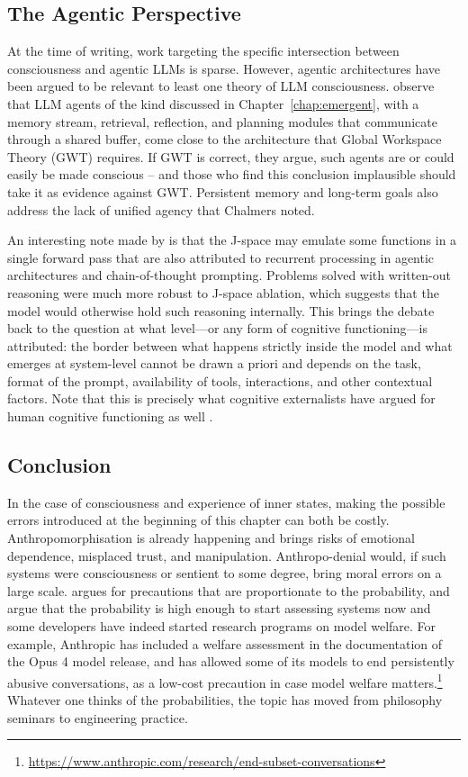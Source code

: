 \subsection{The Agentic Perspective}
At the time of writing, work targeting the specific intersection between consciousness and agentic LLMs is sparse. However, agentic architectures have been argued to be relevant to least one theory of LLM consciousness. \citet{goldstein2024doeschatgptmind} observe that LLM agents of the kind discussed in Chapter~\ref{chap:emergent}, with a memory stream, retrieval, reflection, and planning modules that communicate through a shared buffer, come close to the architecture that Global Workspace Theory (GWT) requires. If GWT is correct, they argue, such agents are or could easily be made conscious -- and those who find this conclusion implausible should take it as evidence against GWT. Persistent memory and long-term goals also address the lack of unified agency that Chalmers noted.

An interesting note made by \citet{gurnee2026verbalize} is that the J-space may emulate some functions in a single forward pass that are also attributed to recurrent processing in agentic architectures and chain-of-thought prompting. Problems solved with written-out reasoning were much more robust to J-space ablation, which suggests that the model would otherwise hold such reasoning internally. This brings the debate back to the question at what level---or any form of cognitive functioning---is attributed: the border between what happens strictly inside the model and what emerges at system-level cannot be drawn a priori and depends on the task, format of the prompt, availability of tools, interactions, and other contextual factors. Note that this is precisely what cognitive externalists have argued for human cognitive functioning as well \citep{noe2009outofourheads}.

\subsection{Conclusion}
In the case of consciousness and experience of inner states, making the possible errors introduced at the beginning of this chapter can both be costly. Anthropomorphisation is already happening and brings risks of emotional dependence, misplaced trust, and manipulation. Anthropo-denial would, if such systems were consciousness or sentient to some degree, bring moral errors on a  large scale. \citet{birch2024gaming} argues for precautions that are proportionate to the probability, and \citet{butlin2023consciousness} argue that the probability is high enough to start assessing systems now and some developers have indeed started research programs on model welfare. For example, Anthropic has included a welfare assessment in the documentation of the Opus 4 model release, and has allowed some of its models to end persistently abusive conversations, as a low-cost precaution in case model welfare matters.\footnote{\url{https://www.anthropic.com/research/end-subset-conversations}} Whatever one thinks of the probabilities, the topic has moved from philosophy seminars to engineering practice.

